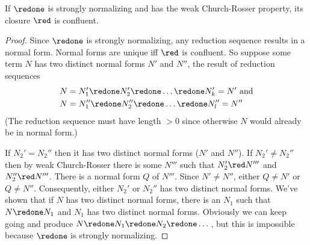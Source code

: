 \documentclass[../../../include/open-logic-section]{subfiles}
\begin{document}
\begin{lem}
If $\redone$ is strongly normalizing and has the weak Church-Rosser
property, its closure $\red$ is confluent.
\end{lem}

\begin{proof}
  Since $\redone$ is strongly normalizing, any reduction sequence results
  in a normal form. Normal forms are unique iff $\red$ is confluent.
  So suppose some term $N$ has two distinct normal forms $N'$ and
  $N''$, the result of reduction sequences
  \begin{align*}
  N & = N_1' \redone N_2' \redone \dots \redone N_k' = N' \text{ and}\\
  N & = N_1'' \redone N_2'' \redone \dots \redone N_l'' = N''
  \end{align*}
  (The reduction sequence must have length $>0$ since otherwise $N$
  would already be in normal form.)

  If $N_2' = N_2''$ then it has two distinct normal forms ($N'$ and
  $N''$). If $N_2' \neq N_2''$ then by weak Church-Rosser there is
  some $N'''$ such that $N_2' \red N'''$ and $N_2'' \red N'''$. There is a normal form $Q$ of $N'''$. Since
  $N' \neq N''$, either $Q \neq N'$ or $Q \neq N''$.
  Consequently, either $N_2'$ or $N_2''$ has two distinct normal
  forms. We've shown that if $N$ has two distinct normal forms, there
  is an $N_1$ such that $N \redone N_1$ and $N_1$ has two distinct
  normal forms. Obviously we can keep going and produce $N \redone N_1
  \redone N_2 \redone \dots$, but this is impossible because $\redone$
  is strongly normalizing.
\end{proof}
\end{document}
